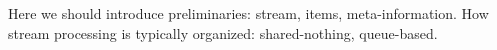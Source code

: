 
Here we should introduce preliminaries: stream, items, meta-information. How stream processing is typically organized: shared-nothing, queue-based.